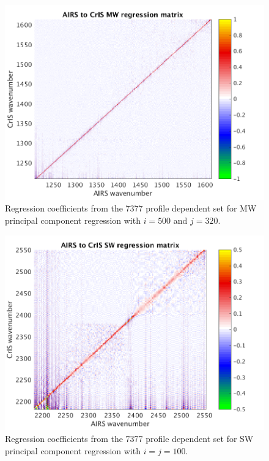 \documentclass[10pt,twocolumn]{article}
\begin{document}
\begin{figure} %
  \centering
  \includegraphics[width=\linewidth]{figures/MW_pc_regr_mat.png}
  \caption{Regression coefficients from the 7377 profile dependent
    set for MW principal component regression with $i = 500$ and $j
    = 320$.}
  \label{dreg8}
\end{figure}

\begin{figure} %
  \centering
  \includegraphics[width=\linewidth]{figures/SW_pc_regr_mat.png}
  \caption{Regression coefficients from the 7377 profile dependent
    set for SW principal component regression with $i = j = 100$.}
  \label{dreg9}
\end{figure}
\end{document}
